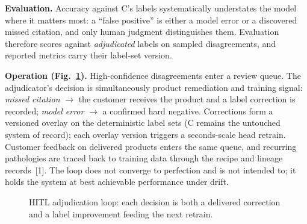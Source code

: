 \documentclass[conference]{IEEEtran}
\begin{document}
\textbf{Evaluation.} Accuracy against C's labels systematically understates the model where it matters most: a ``false positive'' is either a model error or a discovered missed citation, and only human judgment distinguishes them. Evaluation therefore scores against \emph{adjudicated} labels on sampled disagreements, and reported metrics carry their label-set version.

\textbf{Operation (Fig.~\ref{fig:loop}).} High-confidence disagreements enter a review queue. The adjudicator's decision is simultaneously product remediation and training signal: \emph{missed citation} $\rightarrow$ the customer receives the product and a label correction is recorded; \emph{model error} $\rightarrow$ a confirmed hard negative. Corrections form a versioned overlay on the deterministic label sets (C remains the untouched system of record); each overlay version triggers a seconds-scale head retrain. Customer feedback on delivered products enters the same queue, and recurring pathologies are traced back to training data through the recipe and lineage records~[1]. The loop does not converge to perfection and is not intended to; it holds the system at best achievable performance under drift.

\begin{figure}[t]
\centering
{}
\caption{HITL adjudication loop: each decision is both a delivered correction and a label improvement feeding the next retrain.}
\label{fig:loop}
\end{figure}
\end{document}
